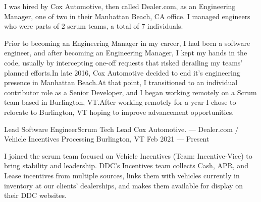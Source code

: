 

\begin{cvparagraph}
I was hired by Cox Automotive, then called Dealer.com, as an
Engineering Manager, one of two in their Manhattan Beach, CA office.
I managed engineers who were parts of 2 scrum teams, a total of 7
individuals.
\end{cvparagraph}


\begin{cvparagraph}
Prior to becoming an Engineering Manager in my career, I had been a
software engineer, and after becoming an Engineering Manager, I kept my
hands in the code, usually by intercepting one-off requests that
risked derailing my teams' planned efforts.\@ In late 2016, Cox
Automotive decided to end it's engineering presence in Manhattan
Beach.\@ At that point, I transitioned to an individual contributor role as a
Senior Developer, and I began working remotely on a Scrum team based
in Burlington, VT.\@ After working remotely for a year I chose to
relocate to Burlington, VT hoping to improve advancement opportunities.
\end{cvparagraph}


\begin{cventries}
  \cventry
    {Lead Software Engineer{\enskip\cdotp\enskip}Scrum Tech Lead} %
    {Cox Automotive. --- Dealer.com / Vehicle Incentives Processing} %
    {Burlington, VT} %
    {Feb 2021 --- Present} %
    {}
\end{cventries}
\vspace{-6.00mm}

\begin{cvparagraph}
I joined the scrum team focused on Vehicle Incentives (Team: Incentive-Vice) to bring stability and leadership.
DDC's Incentives team collects Cash, APR, and Lease incentives from multiple sources,
links them with vehicles currently in inventory at our clients' dealerships,
and makes them available for display on their DDC websites.
\end{cvparagraph}

